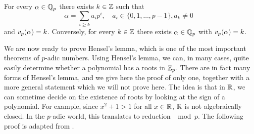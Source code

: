 \begin{prop}
For every $\alpha\in\mathbb{Q}_p$ there exists $k\in\mathbb{Z}$ such that
\[\alpha=\sum_{i\geq k}a_ip^i,\quad a_i\in\{0,1,\dots, p-1\}, a_k\neq 0\]
and $v_p(\alpha)=k$. Conversely, for every $k\in\mathbb{Z}$ there exists $\alpha\in\mathbb{Q}_p$ with $v_p(\alpha)=k$.
\end{prop} 

We are now ready to prove Hensel's lemma, which is one of the most important theorems of $p$-adic numbers. Using Hensel's lemma, we can, in many cases, quite easily determine whether a polynomial has a roots in $\mathbb{Z}_p$.
There are in fact many forms of Hensel's lemma, and we give here the proof of only one, together with a more general statement which we will not prove here.
The idea is that in $\mathbb{R}$, we can sometime decide on the existence of roots by looking at the sign of a polynomial. For example, since $x^2+1>1$ for all $x\in\mathbb{R}$, $\mathbb{R}$ is not algebraically closed.
In the $p$-adic world, this translates to reduction $\mod p$. The following proof is adapted from \cite[p. 89]{Gouvea_2013}.

